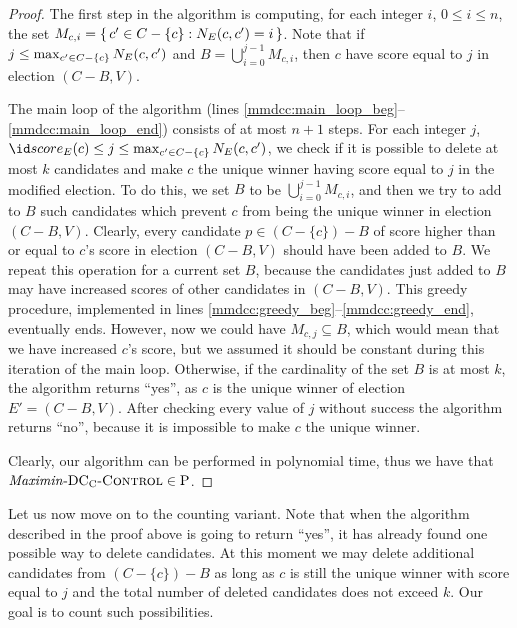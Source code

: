 \begin{proof}
The first step in the algorithm is computing, for each integer $i$, $0\le i\le n$, the set $M_{c,i}=\{\,c'\in C-\{c\}:N_{E}(c,c')=i\,\}$.
Note that if $j\le\max_{c'\in C-\{c\}}N_{E}(c,c')$ and $B=\bigcup_{i=0}^{j-1}M_{c,i}$, then $c$ have score equal to $j$ in election $(C-B,V)$.

The main loop of the algorithm (lines \ref{mmdcc:main_loop_beg}--\ref{mmdcc:main_loop_end}) consists of at most $n+1$ steps.
For each integer $j$, $\score{E}(c)\le j\le\max_{c'\in C-\{c\}}\beaten{E}(c,c')$, we check if it is possible to delete at most $k$ candidates and make $c$ the unique winner having score equal to $j$ in the modified election.
To do this, we set $B$ to be $\bigcup_{i=0}^{j-1}M_{c,i}$, and then we try to add to $B$ such candidates which prevent $c$ from being the unique winner in election $(C-B,V)$.
Clearly, every candidate $p\in(C-\{c\})-B$ of score higher than or equal to $c$'s score in election $(C-B,V)$ should have been added to $B$.
We repeat this operation for a current set $B$, because the candidates just added to $B$ may have increased scores of other candidates in $(C-B,V)$.
This greedy procedure, implemented in lines \ref{mmdcc:greedy_beg}--\ref{mmdcc:greedy_end}, eventually ends.
However, now we could have $M_{c,j}\subseteq B$, which would mean that we have increased $c$'s score, but we assumed it should be constant during this iteration of the main loop.
Otherwise, if the cardinality of the set $B$ is at most $k$, the algorithm returns ``yes'', as $c$ is the unique winner of election $E'=(C-B,V)$.
After checking every value of $j$ without success the algorithm returns ``no'', because it is impossible to make $c$ the unique winner.

Clearly, our algorithm can be performed in polynomial time, thus we have that ${\it Maximin\/}\textnormal{-DC${}_\textnormal{C}$-}\textsc{Control}\in\textnormal{P}$.
\end{proof}

Let us now move on to the counting variant.
Note that when the algorithm described in the proof above is going to return ``yes'', it has already found one possible way to delete candidates.
At this moment we may delete additional candidates from $(C-\{c\})-B$ as long as $c$ is still the unique winner with score equal to $j$ and the total number of deleted candidates does not exceed $k$.
Our goal is to count such possibilities.

